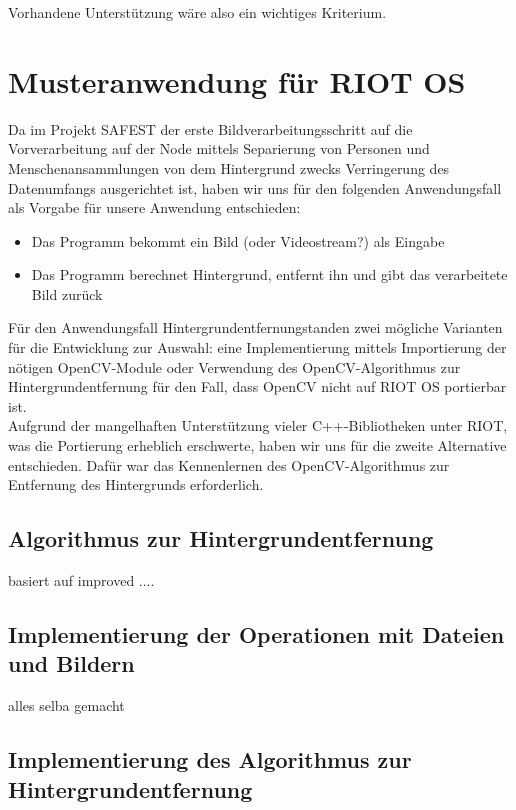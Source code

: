 \documentclass[10pt,a4paper]{article}
\begin{document}
Vorhandene Unterstützung wäre also ein wichtiges Kriterium.  \\


\newpage
\section{Musteranwendung für RIOT OS}


Da im Projekt SAFEST der erste Bildverarbeitungsschritt auf die Vorverarbeitung auf der Node mittels Separierung von Personen und Menschenansammlungen von dem Hintergrund zwecks Verringerung des Datenumfangs ausgerichtet ist, haben wir uns für den folgenden Anwendungsfall als Vorgabe für unsere Anwendung entschieden: 

\begin{itemize}
\item Das Programm bekommt ein Bild (oder Videostream?) als Eingabe
\item Das Programm berechnet Hintergrund, entfernt ihn und gibt das verarbeitete Bild zurück
\end{itemize}

Für den Anwendungsfall \glqq Hintergrundentfernung\grqq standen zwei mögliche Varianten für die Entwicklung zur Auswahl: eine Implementierung mittels Importierung der nötigen OpenCV-Module oder Verwendung des OpenCV-Algorithmus zur Hintergrundentfernung für den Fall, dass OpenCV nicht auf RIOT OS portierbar ist. \\

Aufgrund der mangelhaften Unterstützung vieler C++-Bibliotheken unter RIOT, was die Portierung erheblich erschwerte, haben wir uns für die zweite Alternative entschieden. Dafür war das Kennenlernen des OpenCV-Algorithmus zur Entfernung des Hintergrunds erforderlich. \\

\subsection{Algorithmus zur Hintergrundentfernung}

basiert auf improved ....

\subsection{Implementierung der Operationen mit Dateien und Bildern}

alles selba gemacht

\subsection{Implementierung des Algorithmus zur Hintergrundentfernung}
\end{document}

